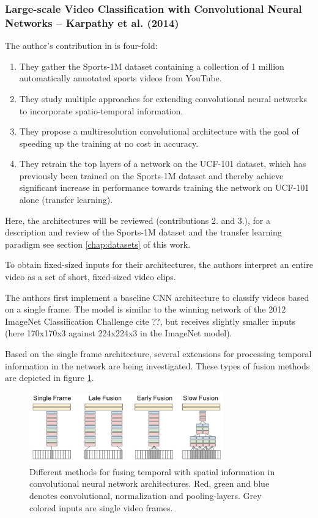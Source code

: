 \subsubsection{Large-scale Video Classification with Convolutional Neural Networks -- Karpathy et al. (2014)}

The author's contribution in \cite{karpathy_large-scale_2014} is four-fold:
\begin{enumerate}
    \item They gather the Sports-1M dataset containing a collection of 1 million automatically annotated sports videos from YouTube.
    \item They study multiple approaches for extending convolutional neural networks to incorporate spatio-temporal information.
    \item They propose a multiresolution convolutional architecture with the goal of speeding up the training at no cost in accuracy.
    \item They retrain the top layers of a network on the UCF-101 dataset, which has previously been trained on the Sports-1M dataset and thereby achieve significant increase in performance towards training the network on UCF-101 alone (transfer learning).
\end{enumerate}

Here, the architectures will be reviewed (contributions 2. and 3.), for a description and review of the Sports-1M dataset and the transfer learning paradigm see section \ref{chap:datasets} of this work.

To obtain fixed-sized inputs for their architectures, the authors interpret an entire video as a set of short, fixed-sized video clips.

The authors first implement a baseline CNN architecture to classify videos based on a single frame.
The model is similar to the winning network of the 2012 ImageNet Classification Challenge cite ??, but receives slightly smaller inputs (here 170x170x3 against 224x224x3 in the ImageNet model).

Based on the single frame architecture, several extensions for processing temporal information in the network are being investigated. These types of fusion methods are depicted in figure \ref{fig:largescale_fusionmethods}.

\begin{figure}[H]
    \centering
    \includegraphics[width=0.75\textwidth]{img_deep/largescale_fusionmethods}
    \caption{Different methods for fusing temporal with spatial information in convolutional neural network architectures. Red, green and blue denotes convolutional, normalization and pooling-layers. Grey colored inputs are single video frames. \cite{karpathy_large-scale_2014}}
    \label{fig:largescale_fusionmethods}
\end{figure}


